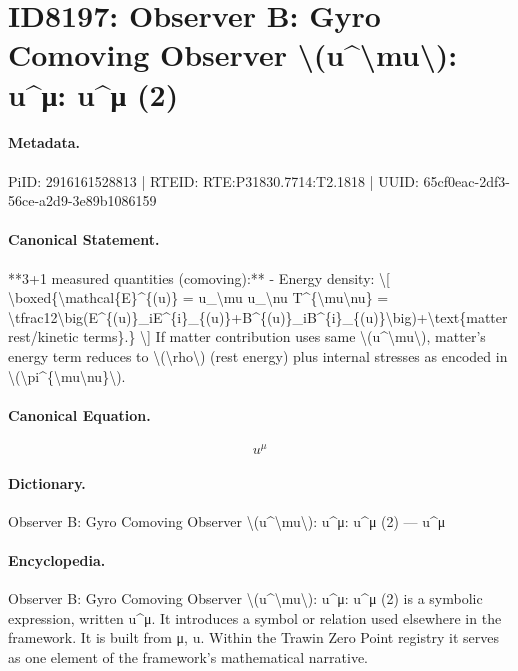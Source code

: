 \section*{ID8197: Observer B: Gyro Comoving Observer \textbackslash{}(u\textasciicircum{}\textbackslash{}mu\textbackslash{}): u\textasciicircum{}μ: u\textasciicircum{}μ (2)}
\paragraph{Metadata.}
PiID: 2916161528813 | RTEID: RTE:P31830.7714:T2.1818 | UUID: 65cf0eac-2df3-56ce-a2d9-3e89b1086159

\paragraph{Canonical Statement.}
**3+1 measured quantities (comoving):** - Energy density: \textbackslash{}[ \textbackslash{}boxed\{\textbackslash{}mathcal\{E\}\textasciicircum{}\{(u)\} = u\_\textbackslash{}mu u\_\textbackslash{}nu T\textasciicircum{}\{\textbackslash{}mu\textbackslash{}nu\} = \textbackslash{}tfrac12\textbackslash{}big(E\textasciicircum{}\{(u)\}\_iE\textasciicircum{}\{i\}\_\{(u)\}+B\textasciicircum{}\{(u)\}\_iB\textasciicircum{}\{i\}\_\{(u)\}\textbackslash{}big)+\textbackslash{}text\{matter rest/kinetic terms\}.\} \textbackslash{}] If matter contribution uses same \textbackslash{}(u\textasciicircum{}\textbackslash{}mu\textbackslash{}), matter's energy term reduces to \textbackslash{}(\textbackslash{}rho\textbackslash{}) (rest energy) plus internal stresses as encoded in \textbackslash{}(\textbackslash{}pi\textasciicircum{}\{\textbackslash{}mu\textbackslash{}nu\}\textbackslash{}).

\paragraph{Canonical Equation.}
\[
u^\mu
\]

\paragraph{Dictionary.}
Observer B: Gyro Comoving Observer \textbackslash{}(u\textasciicircum{}\textbackslash{}mu\textbackslash{}): u\textasciicircum{}μ: u\textasciicircum{}μ (2) — u\textasciicircum{}μ

\paragraph{Encyclopedia.}
Observer B: Gyro Comoving Observer \textbackslash{}(u\textasciicircum{}\textbackslash{}mu\textbackslash{}): u\textasciicircum{}μ: u\textasciicircum{}μ (2) is a symbolic expression, written u\textasciicircum{}μ. It introduces a symbol or relation used elsewhere in the framework. It is built from μ, u. Within the Trawin Zero Point registry it serves as one element of the framework's mathematical narrative.
